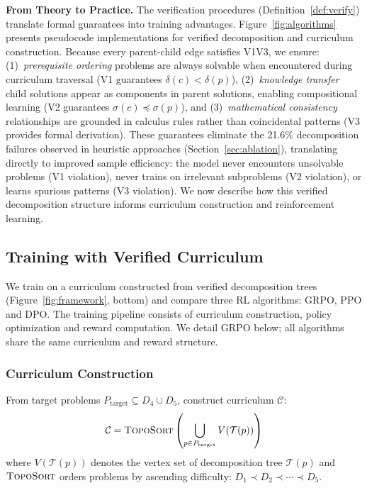 \documentclass[a4paper,fleqn]{cas-dc}
\theoremstyle{definition}
\begin{document}
\vspace{0.5em}
\noindent
\textbf{From Theory to Practice.}
The verification procedures (Definition~\ref{def:verify}) translate formal guarantees into training advantages. Figure~\ref{fig:algorithms} presents pseudocode implementations for verified decomposition and curriculum construction. Because every parent-child edge satisfies V1\textendash V3, we ensure: (1)~\textit{prerequisite ordering} problems are always solvable when encountered during curriculum traversal (V1 guarantees $\delta(c) < \delta(p)$), (2)~\textit{knowledge transfer} child solutions appear as components in parent solutions, enabling compositional learning (V2 guarantees $\sigma(c) \preceq \sigma(p)$), and (3)~\textit{mathematical consistency} relationships are grounded in calculus rules rather than coincidental patterns (V3 provides formal derivation). These guarantees eliminate the 21.6\% decomposition failures observed in heuristic approaches (Section~\ref{sec:ablation}), translating directly to improved sample efficiency: the model never encounters unsolvable problems (V1 violation), never trains on irrelevant subproblems (V2 violation), or learns spurious patterns (V3 violation). We now describe how this verified decomposition structure informs curriculum construction and reinforcement learning.

\subsection{Training with Verified Curriculum}
\label{sec:training}
We train on a curriculum constructed from verified decomposition trees (Figure~\ref{fig:framework}, bottom) and compare three RL algorithms: GRPO, PPO and DPO. The training pipeline consists of curriculum construction, policy optimization and reward computation. We detail GRPO below; all algorithms share the same curriculum and reward structure.

\subsubsection{Curriculum Construction}
From target problems $P_{\text{target}} \subseteq D_4 \cup D_5$, construct curriculum $\mathcal{C}$:
\begin{equation}
\mathcal{C} = \textsc{TopoSort}\left(\bigcup_{p \in P_{\text{target}}} V(\mathcal{T}(p))\right)
\end{equation}
where $V(\mathcal{T}(p))$ denotes the vertex set of decomposition tree $\mathcal{T}(p)$ and $\textsc{TopoSort}$ orders problems by ascending difficulty: $D_1 \prec D_2 \prec \cdots \prec D_5$.
\end{document}
